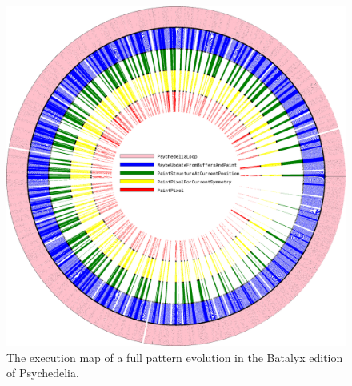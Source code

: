 \begin{figure}[H]                                                          
  \centering                                                             
  \begin{adjustbox}{width=13cm,center}                                   
  \includegraphics[width=13cm]{src/after_effects/execution_cycle.png}%
  \end{adjustbox}                                                        
\caption{The execution map of a full pattern evolution in the Batalyx edition of Psychedelia.}                                           
\end{figure}                                                               
\vfill

